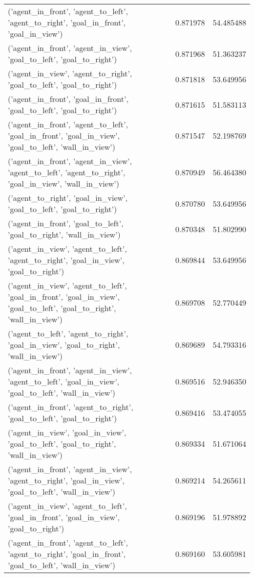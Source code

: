 \begin{tabular}{lrr}
('agent\_in\_front', 'agent\_to\_left', 'agent\_to\_right', 'goal\_in\_front', 'goal\_in\_view') & 0.871978 & 54.485488 \\
('agent\_in\_front', 'agent\_in\_view', 'goal\_to\_left', 'goal\_to\_right') & 0.871968 & 51.363237 \\
('agent\_in\_view', 'agent\_to\_right', 'goal\_to\_left', 'goal\_to\_right') & 0.871818 & 53.649956 \\
('agent\_in\_front', 'goal\_in\_front', 'goal\_to\_left', 'goal\_to\_right') & 0.871615 & 51.583113 \\
('agent\_in\_front', 'agent\_to\_left', 'goal\_in\_front', 'goal\_in\_view', 'goal\_to\_left', 'wall\_in\_view') & 0.871547 & 52.198769 \\
('agent\_in\_front', 'agent\_in\_view', 'agent\_to\_left', 'agent\_to\_right', 'goal\_in\_view', 'wall\_in\_view') & 0.870949 & 56.464380 \\
('agent\_to\_right', 'goal\_in\_view', 'goal\_to\_left', 'goal\_to\_right') & 0.870780 & 53.649956 \\
('agent\_in\_front', 'goal\_to\_left', 'goal\_to\_right', 'wall\_in\_view') & 0.870348 & 51.802990 \\
('agent\_in\_view', 'agent\_to\_left', 'agent\_to\_right', 'goal\_in\_view', 'goal\_to\_right') & 0.869844 & 53.649956 \\
('agent\_in\_view', 'agent\_to\_left', 'goal\_in\_front', 'goal\_in\_view', 'goal\_to\_left', 'goal\_to\_right', 'wall\_in\_view') & 0.869708 & 52.770449 \\
('agent\_to\_left', 'agent\_to\_right', 'goal\_in\_view', 'goal\_to\_right', 'wall\_in\_view') & 0.869689 & 54.793316 \\
('agent\_in\_front', 'agent\_in\_view', 'agent\_to\_left', 'goal\_in\_view', 'goal\_to\_left', 'wall\_in\_view') & 0.869516 & 52.946350 \\
('agent\_in\_front', 'agent\_to\_right', 'goal\_to\_left', 'goal\_to\_right') & 0.869416 & 53.474055 \\
('agent\_in\_view', 'goal\_in\_view', 'goal\_to\_left', 'goal\_to\_right', 'wall\_in\_view') & 0.869334 & 51.671064 \\
('agent\_in\_front', 'agent\_in\_view', 'agent\_to\_right', 'goal\_in\_view', 'goal\_to\_left', 'wall\_in\_view') & 0.869214 & 54.265611 \\
('agent\_in\_view', 'agent\_to\_left', 'goal\_in\_front', 'goal\_in\_view', 'goal\_to\_right') & 0.869196 & 51.978892 \\
('agent\_in\_front', 'agent\_to\_left', 'agent\_to\_right', 'goal\_in\_front', 'goal\_to\_left', 'wall\_in\_view') & 0.869160 & 53.605981 \\

\end{tabular}
